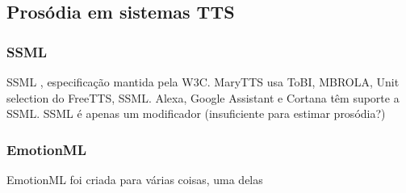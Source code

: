 \subsection{Prosódia em sistemas TTS}
\subsubsection{SSML}
SSML \cite{ssml}, especificação mantida pela W3C.
MaryTTS usa ToBI, MBROLA, Unit selection do FreeTTS, SSML.
Alexa, Google Assistant e Cortana têm suporte a SSML.
SSML é apenas um modificador (insuficiente para estimar prosódia?)
\subsubsection{EmotionML}
EmotionML \cite{emotionml} foi criada para várias coisas, uma delas